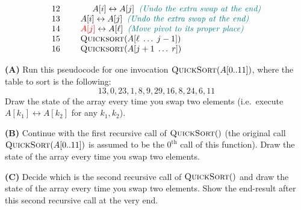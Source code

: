 \documentclass[a4paper,12pt]{article}
\begin{document}
\[\begin{array}{rl}
12 & \hspace{1.0cm} A[i] \leftrightarrow A[j] \;\; \textcolor{teal}{\text{\em (Undo the extra swap at the end)}}\\
13 & \hspace{0.5cm} A[i] \leftrightarrow A[j] \;\; \textcolor{teal}{\text{\em (Undo the extra swap at the end)}}\\
14 & \hspace{0.5cm} \textcolor{red}{A[j]} \leftrightarrow A[\ell] \;\; \textcolor{teal}{\text{\em (Move pivot to its proper place)}}\\
15 & \hspace{0.5cm} \text{\textsc{Quicksort}}(A[\ell\;\ldots\;j-1])\\
16 & \hspace{0.5cm} \text{\textsc{Quicksort}}(A[j+1\;\ldots\;r])\\
\end{array}
\]


\vspace{5pt}
{\bf (A)}
Run this pseudocode for one invocation $\text{\textsc{QuickSort}}(A[0..11])$, 
where the table to sort is the following: 
$$13, 0, 23, 1, 8, 9, 29, 16, 8, 24, 6, 11$$
Draw the state of the array every time you swap two 
elements (i.e.\ execute $A[k_1] \leftrightarrow A[k_2]$ for any $k_1,k_2$).

\vspace{5pt}
{\bf (B)}
Continue with the first recursive call of $\text{\textsc{QuickSort}}()$
(the original call $\text{\textsc{QuickSort}}(A[0..11])$ is assumed to be the
$0^{\text{th}}$ call of this function). 
Draw the state of the array every time you swap two 
elements. 


\vspace{5pt}
{\bf (C)} Decide which is the second recursive call of 
$\text{\textsc{QuickSort}}()$ and draw the state 
of the array every time you swap two elements. 
Show the end-result 
after this second recursive call at the very end.
\end{document}
